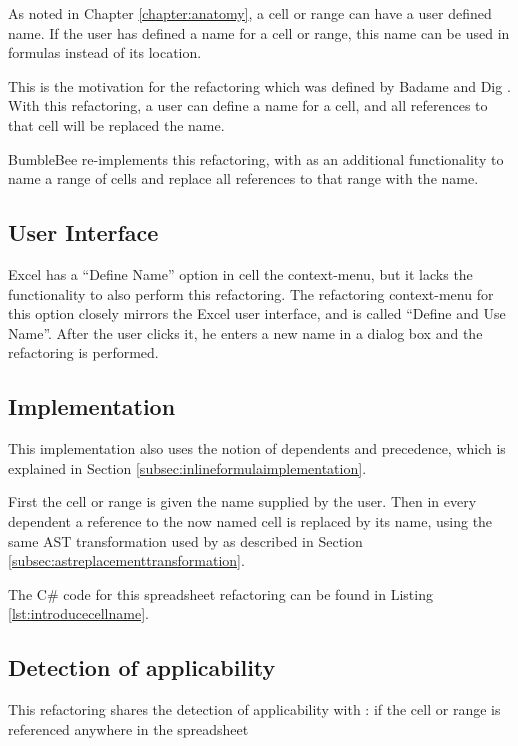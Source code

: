 As noted in Chapter \ref{chapter:anatomy}, a cell or range can have a user defined name.
If the user has defined a name for a cell or range, this name can be used in formulas instead of its location.

This is the motivation for the  refactoring which was defined by Badame and Dig \cite{badame2012refactoring}.
With this refactoring, a user can define a name for a cell, and all references to that cell will be replaced the name.

BumbleBee re-implements this refactoring, with as an additional functionality to name a range of cells and replace all references to that range with the name.

\subsection{User Interface}

Excel has a ``Define Name'' option in cell the context-menu, but it lacks the functionality to also perform this refactoring.
The refactoring context-menu for this option closely mirrors the Excel user interface, and is called ``Define and Use Name''.
After the user clicks it, he enters a new name in a dialog box and the refactoring is performed.

\subsection{Implementation}

This implementation also uses the notion of dependents and precedence, which is explained in Section \ref{subsec:inlineformulaimplementation}.

First the cell or range is given the name supplied by the user.
Then in every dependent a reference to the now named cell is replaced by its name, using the same AST transformation used by  as described in Section \ref{subsec:astreplacementtransformation}.

The C\# code for this spreadsheet refactoring can be found in Listing \ref{lst:introducecellname}.

\subsection{Detection of applicability}

This refactoring shares the detection of applicability with : if the cell or range is referenced anywhere in the spreadsheet 

